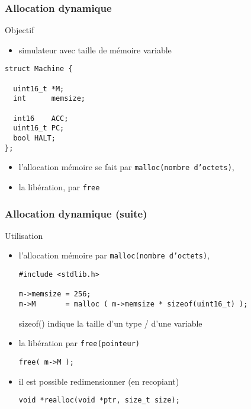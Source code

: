 \documentclass[]{beamer}
\begin{document}
\begin{frame}[containsverbatim]
\frametitle{Allocation dynamique}

\alert{Objectif} 
\begin{itemize}
\item simulateur avec taille de mémoire variable
\end{itemize}

\begin{verbatim}
struct Machine {

  uint16_t *M;
  int      memsize;

  int16    ACC;     
  uint16_t PC;      
  bool HALT;
};
\end{verbatim}

\begin{itemize}
\item l'\alert{allocation mémoire} se fait par \texttt{malloc(nombre d'octets)},
\item la \alert{libération}, par \texttt{free}
\end{itemize}
\end{frame}


\begin{frame}[containsverbatim]
\frametitle{Allocation dynamique (suite)}

\alert{Utilisation}
\begin{itemize}
\item l'\alert{allocation mémoire} par \texttt{malloc(nombre d'octets)},
\begin{verbatim}
#include <stdlib.h>

m->memsize = 256;
m->M       = malloc ( m->memsize * sizeof(uint16_t) );
\end{verbatim}
\alert{sizeof()} indique la taille d'un type / d'une variable
\item la \alert{libération} par \texttt{free(pointeur)}
\begin{verbatim}
free( m->M );
\end{verbatim}
\item il est possible \alert{redimensionner} (en recopiant)
\begin{verbatim}
void *realloc(void *ptr, size_t size);
\end{verbatim}
\end{itemize}
\end{frame}
\end{document}
